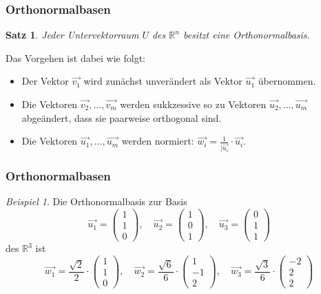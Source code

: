 \documentclass[hyperref={pdfpagelabels=false}]{beamer}
\theoremstyle{plain}%
\newtheorem*{satz}{Satz}
\theoremstyle{definition}
\theoremstyle{remark}
\newtheorem*{beispiel}{Beispiel}
\def \R{\mathbb R}
\newcommand{\vektor}[1]{\overrightarrow{#1}}
\begin{document}
\begin{frame}
\frametitle{Orthonormalbasen}

\begin{satz}\label{uvr_gram_schmidt} Jeder Untervektorraum $U$ des $\mathbb R^n$ besitzt eine 
Orthonormalbasis.
\end{satz}

\pause

Das Vorgehen ist dabei wie folgt: 

\begin{itemize}
\item<3-> Der Vektor $ \vektor{v_1}$ wird zunächst unverändert als Vektor $\vektor{u_1}$ übernommen.
\item<4-> Die Vektoren $\vektor{v_2}, \ldots, \vektor{v_m}$ werden sukkzessive so zu Vektoren $\vektor{u_2}, 
\ldots, \vektor{u_m}$ abgeändert, dass sie paarweise orthogonal sind. 
\item<5-> Die Vektoren $\vektor{u_1}, \ldots, \vektor{u_m}$ werden normiert: $\vektor{w_i} = 
\frac {1}{\vert \vektor{u_i}} \cdot \vektor{u_i}$. 
\end{itemize}
\end{frame}

\begin{frame}
\frametitle{Orthonormalbasen}

\begin{beispiel}
Die Orthonormalbasis zur Basis 
  	$$ \vektor{u_1} = \left( \begin{matrix} 1 \\ 1 \\ 0 \end{matrix} \right), \quad 
   	\vektor{u_2} = \left( \begin{matrix} 1 \\ 0 \\ 1 \end{matrix} \right), \quad 
   	\vektor{u_3} = \left( \begin{matrix} 0 \\ 1\\ 1 \end{matrix} \right)  $$
des $\R^3$ ist \pause \pause 
  	$$ \vektor{w_1} = \frac {\sqrt{2}}{2} \cdot \left( \begin{matrix} 1 \\ 1 \\ 0 \end{matrix} \right), \quad 
   	\vektor{w_2} = \frac {\sqrt{6}}{6} \cdot \left( \begin{matrix} 1 \\ -1 \\ 2 \end{matrix} \right), \quad 
   	\vektor{w_3} = \frac {\sqrt{3}}{6} \cdot \left( \begin{matrix} -2 \\ 2 \\ 2 \end{matrix} \right)  $$
 
\end{beispiel}

\end{frame}
\end{document}
